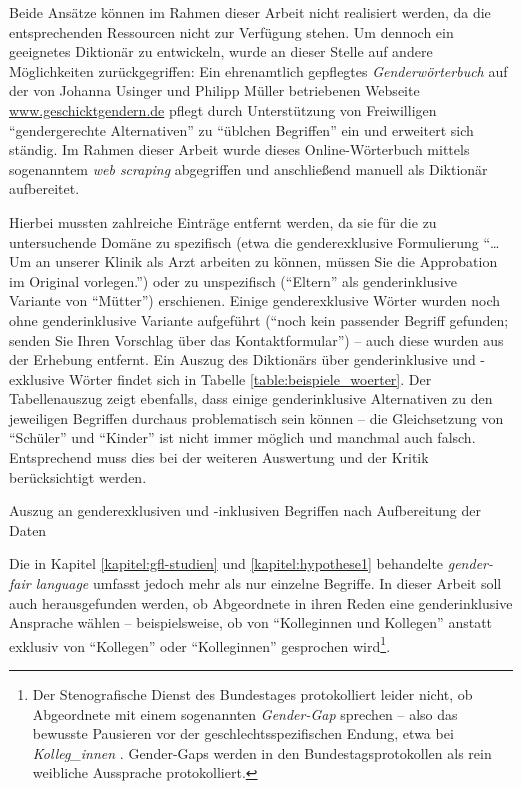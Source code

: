 \documentclass[12pt, 
    twoside=false, 
    bibliography=totoc, 
    numbers=endperiod, 
    headings=normal, 
    toc=chapterentrydotfill
    ]{scrbook}
\begin{document}
Beide Ansätze können im Rahmen dieser Arbeit nicht realisiert werden, da die entsprechenden Ressourcen nicht zur Verfügung stehen. Um dennoch ein geeignetes Diktionär zu entwickeln, wurde an dieser Stelle auf andere Möglichkeiten zurückgegriffen:
Ein ehrenamtlich gepflegtes \emph{Genderwörterbuch} auf der von Johanna Usinger und Philipp Müller betriebenen Webseite \url{www.geschicktgendern.de} pflegt durch Unterstützung von Freiwilligen \enquote{gendergerechte Alternativen} zu \enquote{üblchen Begriffen} ein und erweitert sich ständig. Im Rahmen dieser Arbeit wurde dieses Online-Wörterbuch mittels sogenanntem \emph{web scraping} \parencite{wickham_2016} abgegriffen und anschließend manuell als Diktionär aufbereitet. 

Hierbei mussten zahlreiche Einträge entfernt werden, da sie für die zu untersuchende Domäne zu spezifisch (etwa die genderexklusive Formulierung \enquote{… Um an unserer Klinik als Arzt arbeiten zu können, müssen Sie die Approbation im Original vorlegen.}) oder zu unspezifisch (\enquote{Eltern} als genderinklusive Variante von \enquote{Mütter}) erschienen. Einige genderexklusive Wörter wurden noch ohne genderinklusive Variante aufgeführt (\enquote{noch kein passender Begriff gefunden; senden Sie Ihren Vorschlag über das Kontaktformular}) -- auch diese wurden aus der Erhebung entfernt. Ein Auszug des Diktionärs über genderinklusive und -exklusive Wörter findet sich in Tabelle \ref{table:beispiele_woerter}. Der Tabellenauszug zeigt ebenfalls, dass einige genderinklusive Alternativen zu den jeweiligen Begriffen durchaus problematisch sein können -- die Gleichsetzung von \enquote{Schüler} und \enquote{Kinder} ist nicht immer möglich und manchmal auch falsch. Entsprechend muss dies bei der weiteren Auswertung und der Kritik berücksichtigt werden.


\begin{table}[htb]
    \centering
    \caption[Auszug an genderexklusiven und -inklusiven Begriffen nach Aufbereitung der Daten]{Auszug an genderexklusiven und -inklusiven Begriffen nach Aufbereitung der Daten}
    
    \label{table:beispiele_woerter}
\end{table}

Die in Kapitel \ref{kapitel:gfl-studien} und \ref{kapitel:hypothese1} behandelte \emph{gender-fair language} umfasst jedoch mehr als nur einzelne Begriffe. In dieser Arbeit soll auch herausgefunden werden, ob Abgeordnete in ihren Reden eine genderinklusive Ansprache wählen -- beispielsweise, ob von \enquote{Kolleginnen und Kollegen} anstatt exklusiv von \enquote{Kollegen} oder \enquote{Kolleginnen} gesprochen wird\footnote{Der Stenografische Dienst des Bundestages protokolliert leider nicht, ob Abgeordnete mit einem sogenannten \emph{Gender-Gap} sprechen -- also das bewusste Pausieren vor der geschlechtsspezifischen Endung, etwa bei \emph{Kolleg\_innen} \parencite[vgl.][]{reisigl_2017}. Gender-Gaps werden in den Bundestagsprotokollen als rein weibliche Aussprache protokolliert.}. 
\end{document}

